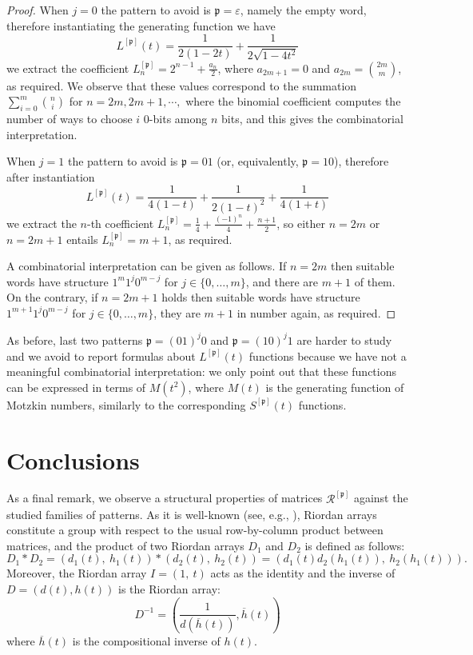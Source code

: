 \begin{proof}
When $j=0$ the pattern to avoid is $\mathfrak{p}=\varepsilon $, namely the
empty word, therefore instantiating the generating function we have
\begin{displaymath}
L^{[\mathfrak{p}]}(t) =\frac{1}{2(1-2t)} +\frac{1}{2\sqrt{1-4t^{2}}}
\end{displaymath}
we extract the coefficient $L_{n}^{[\mathfrak{p}]} = 2^{n-1} + \frac{a_{n}}{2}$,
where $a_{2m+1}=0$ and $a_{2m}={{2m}\choose{m}}$, as required. We observe that these values
correspond to the summation $\sum_{i=0}^m {n \choose i}$ for $n=2m,2m+1,\cdots,$
where the binomial coefficient computes the number of ways to choose $i$  $0$-bits among $n$ bits,
and this gives the combinatorial interpretation.

When $j=1$ the pattern to avoid is $\mathfrak{p}=01$ (or, equivalently,
$\mathfrak{p}=10$), therefore after instantiation
\begin{displaymath}
L^{[\mathfrak{p}]}(t) =\frac{1}{4(1-t)} + \frac{1}{2(1-t)^{2}} +\frac{1}{4(1+t)}
\end{displaymath}
we extract the $n$-th coefficient $L_{n}^{[\mathfrak{p}]} = \frac{1}{4} + \frac{(-1)^{n}}{4} +\frac{n+1}{2} $,
so either $n=2m$ or $n=2m+1$ entails $L_{n}^{[\mathfrak{p}]} = m+1$, as required.

A combinatorial interpretation can be given as follows. If $n=2m$ then suitable
words have structure $1^{m}1^{j}0^{m-j}$ for $j\in \lbrace 0, \ldots,m \rbrace$,
and there are $m+1$ of them. On the contrary, if $n=2m+1$ holds then suitable
words have structure $1^{m+1}1^{j}0^{m-j}$ for $j\in \lbrace 0, \ldots,m
\rbrace$, they are $m+1$ in number again, as required.
\end{proof}

As before, last two patterns $\mathfrak{p}=(01)^{j}0$ and
$\mathfrak{p}=(10)^{j}1$ are harder to study and we avoid to report formulas
about $L^{[\mathfrak{p}]}(t)$ functions because we have not a meaningful
combinatorial interpretation: we only point out that these functions can be
expressed in terms of $M(t^{2})$, where $M(t)$ is the generating function of
Motzkin numbers, similarly to the corresponding $S^{[\mathfrak{p}]}(t)$ functions.

\section{Conclusions}

As a final remark, we observe a structural properties of matrices
$\mathcal{R}^{[\mathfrak{p}]}$ against the studied families of patterns.
As it is well-known (see, e.g., \cite{LMMS14,MRSV97,SGWW91}),
Riordan arrays constitute a group with respect to the usual row-by-column product between matrices,
and the product of two Riordan arrays $D_1$ and $D_2$ is defined as follows:
$$
  D_1 \ast D_2 = (d_1(t),\ h_1(t)) \ast (d_2(t),\ h_2(t)) =(d_1(t)d_2(h_1(t)),\ h_2(h_1(t))).
$$
Moreover, the Riordan array $I = (1,\ t)$ acts as the identity and the inverse of $D =(d(t), h(t))$ is the Riordan array:
$$
D^{-1} = \left( \frac{1}{d(\overline{h}(t))},
  \overline{h}(t) \right)
$$
where $\overline{h}(t)$ is the compositional inverse of $h(t)$.

